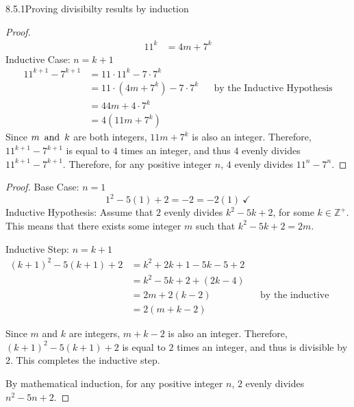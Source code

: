\begin{question}{8.5.1}{Proving divisibilty results by induction}
\begin{proof}
\begin{align*}
      11^k       & = 4m + 7^k
    \end{align*}
    Inductive Case: $n = k+1$
    \begin{align*}
      11^{k+1}-7^{k+1} & = 11\cdot 11^k - 7\cdot 7^k                                            \\
                       & = 11\cdot(4m+7^k) - 7\cdot 7^k &  & \text{by the Inductive Hypothesis} \\
                       & = 44m + 4\cdot 7^k                                                     \\
                       & = 4(11m+7^k)
    \end{align*}
    Since $m \operatorname{~\text{and}~} k$ are both integers, $11m+7^k$ is also an integer. Therefore, $11^{k+1}-7^{k+1}$ is equal to $4$ times an integer, and thus $4$ evenly divides $11^{k+1}-7^{k+1}$. Therefore, for any positive integer $n$, $4$ evenly divides $11^n-7^n$.
  \end{proof}
  \begin{proof}
    Base Case: $n=1$
    \[
      1^2-5(1)+2 = -2 = -2(1)~\checkmark
    \]
    Inductive Hypothesis: Assume that $2$ evenly divides $k^2-5k+2$, for some $k\in\mathbb{Z}^+$. This means that there exists some integer $m$ such that $k^2-5k+2=2m$.

    Inductive Step: $n=k+1$
    \begin{align*}
      (k+1)^2-5(k+1)+2 & = k^2 + 2k + 1 - 5k - 5 + 2                                         \\
                       & = k^2 - 5k + 2 + (2k-4)                                             \\
                       & = 2m + 2(k-2)               &  & \text{by the inductive hypothesis} \\
                       & = 2(m+k-2)
    \end{align*}

    Since $m$ and $k$ are integers, $m+k-2$ is also an integer. Therefore, $(k+1)^2-5(k+1)+2$ is equal to $2$ times an integer, and thus is divisible by $2$. This completes the inductive step.

    By mathematical induction, for any positive integer $n$, $2$ evenly divides $n^2-5n+2$.
  \end{proof}

\end{question}

